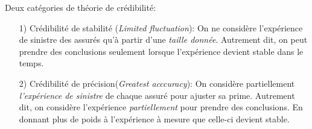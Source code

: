 Deux catégories de théorie de crédibilité:
\begin{itemize}
\item[1)]Crédibilité de stabilité (\textit{Limited fluctuation}): On ne considère l'expérience de sinistre des assurés qu'à partir d'une \emph{\textit{taille} donnée}. Autrement dit, on peut prendre des conclusions seulement lorsque l'expérience devient stable dans le temps.\\

\item[2)]Crédibilité de précision(\textit{Greatest acccuracy}): On considère partiellement \emph{l'expérience de sinistre} de chaque assuré pour ajuster sa prime. Autrement dit, on considère l'expérience \emph{partiellement} pour prendre des conclusions. En donnant plus de poids à l'expérience à mesure que celle-ci devient stable.
\end{itemize}

